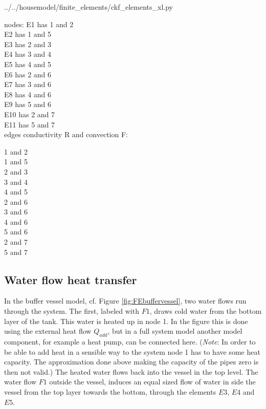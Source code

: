  
{../../housemodel/finite\_elements/ckf\_elements\_xl.py}
	
nodes:
E1 has 1 and 2\\
E2 has 1 and 5\\
E3 has 2 and 3\\
E4 has 3 and 4\\
E5 has 4 and 5\\
E6 has 2 and 6\\
E7 has 3 and 6\\
E8 has 4 and 6\\
E9 has 5 and 6\\
E10 has 2 and 7\\
E11 has 5 and 7\\

edges conductivity R and convection F:

1 and 2\\
1 and 5\\
2 and 3\\
3 and 4\\
4 and 5\\
2 and 6\\
3 and 6\\
4 and 6\\
5 and 6\\
2 and 7\\
5 and 7\\


\subsection{Water flow heat transfer}
In the buffer vessel model, cf. Figure \ref{fig:FEbuffervessel}, two water flows run through the system. The first, labeled with $F1$, draws cold water from the bottom layer of the tank. This water is heated up in node 1. In the figure this is done using the external heat flow $Q_{add}$, but in a full system model another model component, for example a heat pump, can be connected here. (\emph{Note}: In order to be able to add heat in a sensible way to the system node 1 has to have some heat capacity. The approximation done above making the capacity of the pipes zero is then not valid.) 
The heated water flows back into the vessel in the top level. The water flow $F1$ outside the vessel, induces an equal sized flow of water in side the vessel from the top layer towards the bottom, through the elements $E3$, $E4$ and $E5$. 

